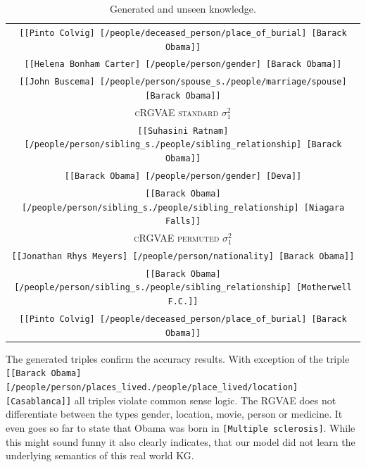 \begin{table}[H]
\begin{tabular}{|c|}
  \texttt{[[Pinto Colvig]	[/people/deceased\_person/place\_of\_burial]	[Barack Obama]]}\\
  \texttt{[[Helena Bonham Carter]	[/people/person/gender]	[Barack Obama]]}\\
  \texttt{[[John Buscema]	[/people/person/spouse\_s./people/marriage/spouse]	[Barack Obama]]}\\ \hline
  \rowcolor[HTML]{EFEFEF} 
  \textsc{cRGVAE standard} $\sigma_1^2$\\ \hline
  \texttt{[[Suhasini Ratnam]	[/people/person/sibling\_s./people/sibling\_relationship]	[Barack Obama]]}\\
  \texttt{[[Barack Obama]	[/people/person/gender]	[Deva]]}\\
  \texttt{[[Barack Obama]	[/people/person/sibling\_s./people/sibling\_relationship]	[Niagara Falls]]}\\ \hline
  \rowcolor[HTML]{EFEFEF} 
  \textsc{cRGVAE permuted} $\sigma_1^2$\\ \hline
  \texttt{[[Jonathan Rhys Meyers]	[/people/person/nationality]	[Barack Obama]]}\\
  \texttt{[[Barack Obama]	[/people/person/sibling\_s./people/sibling\_relationship]	[Motherwell F.C.]]}\\
  \texttt{[[Pinto Colvig]	[/people/deceased\_person/place\_of\_burial]	[Barack Obama]]}\\ \hline
  \end{tabular}
\caption{Generated and unseen knowledge.}
\label{tab5:genTriples}
\end{table}


The generated triples confirm the accuracy results. With exception of the triple \texttt{[[Barack Obama]	[/people/person/places\_lived./people/place\_lived/location]	[Casablanca]]} all triples violate common sense logic. The RGVAE does not differentiate between the types gender, location, movie, person or medicine. It even goes so far to state that Obama was born in \texttt{[Multiple sclerosis]}. While this might sound funny it also clearly indicates, that our model did not learn the underlying semantics of this real world KG.

